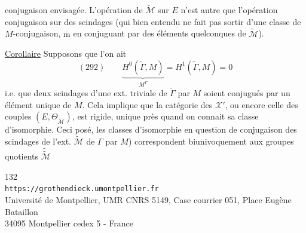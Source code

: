 
conjugaison envisagée. L'opération  de $\widetilde{\mathcal M}$ sur $E$  n'est autre que l'opération   conjugaison sur  des scindages (qui bien entendu ne fait pas sortir d'une classe de $M$-conjugaison, $\overline{\mathrm m}$ en conjuguant par des éléments quelconques de $\widetilde{\mathcal M}$).

\uline{Corollaire} Supposons que l'on ait
\[
(292)\qquad \underbrace{H^0(\widetilde\Gamma,M)}_{M^\Gamma}=H^1(\widetilde\Gamma,M)=0
\]
i.e. que  deux scindages d'une ext. triviale de $\widetilde\Gamma$ par $M$ soient conjugués par un élément unique de $M$. Cela implique  que la catégorie des $\mathcal X'$, ou encore celle des couples $(E,\Theta_{\widetilde{\mathcal M}})$, est rigide,   unique près quand on connait sa classe d'isomorphie. Ceci posé, les classes d'isomorphie en question  de  conjugaison des scindages de  l'ext. $\widetilde{\mathcal M}$ de $\Gamma$ par $M$) correspondent biunivoquement aux groupes quotients $\widetilde{\widetilde{\mathcal M}}$


\begin{center}
\small
132\\
\texttt{https://grothendieck.umontpellier.fr}\\
Université de Montpellier, UMR CNRS 5149, Case courrier 051, Place Eugène Bataillon\\
34095 Montpellier cedex 5 - France
\end{center}
